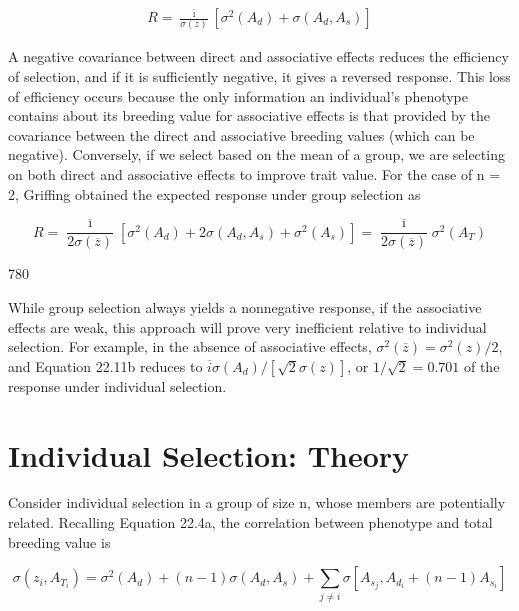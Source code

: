 \documentclass{article}
\begin{document}
\begin{equation}
\begin{align*}R=\frac{\bar\imath}{\sigma(z)}\left[\sigma^2(A_d)+\sigma(A_d,A_s)\right]\end{align*}
\tag{22.11a}
\label{eq:22_11a}
\end{equation}

A negative covariance between direct and associative effects reduces the efficiency of selection, and if it is sufficiently negative, it gives a reversed response. This loss of efficiency occurs because the only information an individual's phenotype contains about its breeding value for associative effects is that provided by the covariance between the direct and associative breeding values (which can be negative). Conversely, if we select based on the mean of a group, we are selecting on both direct and associative effects to improve trait value. For the case of n = 2, Griffing obtained the expected response under group selection as

\begin{equation}
R=\frac{\overline{\imath}}{2\sigma(\overline{z})}\left[\sigma^{2}(A_{d})+2\sigma(A_{d},A_{s})+\sigma^{2}(A_{s})\right]=\frac{\overline{\imath}}{2\sigma(\overline{z})}\sigma^{2}(A_{T})
\tag{22.11b}
\label{eq:22_11b}
\end{equation}

780

While group selection always yields a nonnegative response, if the associative effects are weak, this approach will prove very inefficient relative to individual selection. For example, in the absence of associative effects,  $ \sigma^2(\overline{z}) = \sigma^2(z)/2 $, and Equation 22.11b reduces to  $ \overline{i}\sigma(A_d)/[\sqrt{2}\sigma(z)] $, or  $ 1/\sqrt{2} = 0.701 $ of the response under individual selection.

\section{Individual Selection: Theory}
Consider individual selection in a group of size n, whose members are potentially related. Recalling Equation 22.4a, the correlation between phenotype and total breeding value is

\begin{equation}
\sigma(z_{i},A_{T_{i}})=\sigma^{2}(A_{d})+(n-1)\sigma(A_{d},A_{s})+\sum_{j\neq i}\sigma\left[A_{s_{j}},A_{d_{i}}+(n-1)A_{s_{i}}\right]
\end{equation}
\end{document}
